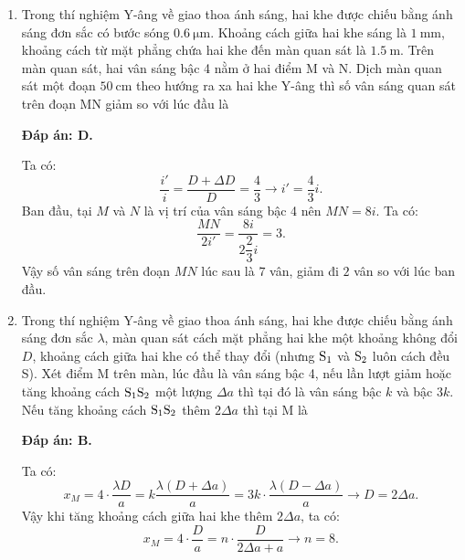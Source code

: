 \begin{enumerate}[label=\bfseries Câu \arabic*:]
	\item {} 
		\cauhoi
	{Trong thí nghiệm Y-âng về giao thoa ánh sáng, hai khe được chiếu bằng ánh sáng đơn sắc có bước sóng $\SI{0.6}{\micro \meter}$. Khoảng cách giữa hai khe sáng là $\SI{1}{\milli \meter}$, khoảng cách từ mặt phẳng chứa hai khe đến màn quan sát là $\SI{1.5}{\meter}$. Trên màn quan sát, hai vân sáng bậc 4 nằm ở hai điểm M và N. Dịch màn quan sát một đoạn $\SI{50}{\centi \meter}$ theo hướng ra xa hai khe Y-âng thì số vân sáng quan sát trên đoạn MN giảm so với lúc đầu là
	}
	
	\loigiai
	{		\textbf{Đáp án: D.}
		
Ta có:
$$
	\dfrac{i'}{i} =  \dfrac{D + \Delta D}{D} = \dfrac{4}{3} \rightarrow i' = \dfrac{4}{3} i.
$$
Ban đầu, tại $ M $ và $ N $ là vị trí của vân sáng bậc 4 nên $ MN = 8i $.			
Ta có:
$$
	\dfrac{MN}{2i'} = \dfrac{8i}{2\dfrac{2}{3}i} = \num{3}.
$$
Vậy số vân sáng trên đoạn $ MN $ lúc sau là $ 7 $ vân, giảm đi $ 2 $ vân so với lúc ban đầu.
	}
	
	\item {} 
		\cauhoi
	{Trong thí nghiệm Y-âng về giao thoa ánh sáng, hai khe được chiếu bằng ánh sáng đơn sắc $\lambda$, màn quan sát cách mặt phẳng hai khe một khoảng không đổi $D$, khoảng cách giữa hai khe có thể thay đổi (nhưng $\text S_1$ và $\text S_2$ luôn cách đều S). Xét điểm M trên màn, lúc đầu là vân sáng bậc 4, nếu lần lượt giảm hoặc tăng khoảng cách $\text S_1 \text S_2$ một lượng $\Delta a$ thì tại đó là vân sáng bậc $k$ và bậc $3k$. Nếu tăng khoảng cách $\text S_1 \text S_2$ thêm $2\Delta a$ thì tại M là
	}
	
	\loigiai
	{		\textbf{Đáp án: B.}
		
Ta có:
$$
	x_{M} = 4 \cdot \dfrac{\lambda D}{a} = k \dfrac{\lambda (D + \Delta a)}{a} = 3k \cdot \dfrac{\lambda (D - \Delta a)}{a} \rightarrow D = 2\Delta a.
$$
Vậy khi tăng khoảng cách giữa hai khe thêm $ 2\Delta a $, ta có:
$$
	x_{M} = 4 \cdot \dfrac{D}{a} = n \cdot \dfrac{D}{2\Delta a + a} \rightarrow n = \num{8}.
$$
		
}
\end{enumerate}
